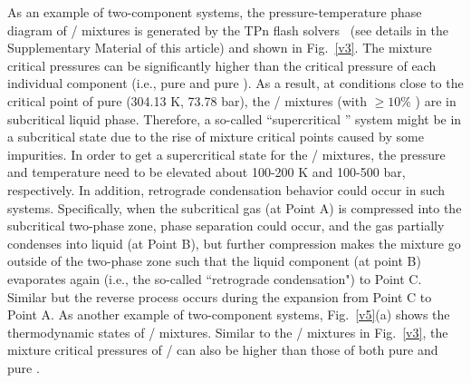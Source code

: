 As an example of two-component  systems, the pressure-temperature phase diagram of / mixtures is generated by the TPn flash solvers~\cite{michelsen1982isothermal} (see details in the Supplementary Material of this article) and shown in Fig.~\ref{v3}. %
The mixture critical pressures can be significantly higher than the critical pressure of each individual component (i.e., pure  and pure ).
As a result, at conditions close to the critical point of pure  (304.13 K, 73.78 bar), the / mixtures (with $\ge10\%$ ) are in subcritical liquid phase. Therefore, a so-called ``supercritical '' system might be in a subcritical state due to the rise of mixture critical points caused by some impurities. In order to get a supercritical state for the / mixtures, the pressure and temperature need to be elevated about 100-200 K and 100-500 bar, respectively. %
In addition, retrograde condensation behavior could occur in such systems. %
Specifically, when the subcritical gas (at Point A) is compressed into the subcritical two-phase zone, phase separation could occur, and the gas partially condenses into liquid (at Point B), but further compression makes the mixture go outside of the two-phase zone such that the liquid component (at point B) evaporates again (i.e., the so-called ``retrograde condensation") to Point C. Similar but the reverse process occurs during the expansion from Point C to Point A.
As another example of two-component  systems, Fig.~\ref{v5}(a) shows the thermodynamic states of / mixtures. Similar to the / mixtures in Fig.~\ref{v3}, the mixture critical pressures of / can also be higher than those of both pure  and pure .

